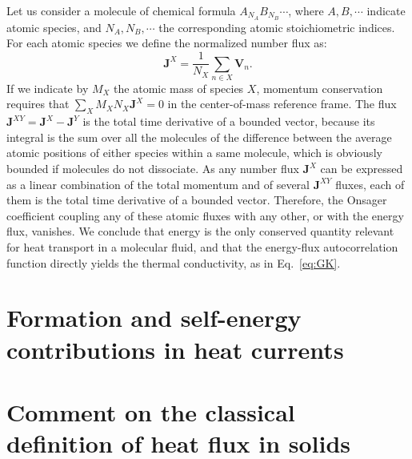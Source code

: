Let us consider a molecule of chemical formula $A_{N_A} B_{N_B}\cdots$, where $A, B,\cdots$ indicate atomic species, and $N_A,N_B,\cdots$ the corresponding atomic stoichiometric indices. For each atomic species we define the normalized number flux as:
\begin{equation}
  \mathbf{J}^X = \frac{1}{N_X}\sum_{n\in X} \mathbf{V}_n. \label{eq:JX}
\end{equation}
If we indicate by $M_X$ the atomic mass of species $X$, momentum conservation requires that $\sum_X M_X N_X \mathbf{J}^X = 0$ in the center-of-mass reference frame. The flux $\mathbf{J}^{XY} = \mathbf{J}^{X}-\mathbf{J}^{Y}$ is the total time derivative of a bounded vector, because its integral is the sum over all the molecules of the difference between the average atomic positions of either species within a same molecule, which is obviously bounded if molecules do not dissociate. As any number flux $\mathbf{J}^X$ can be expressed as a linear combination of the total momentum and of several $\mathbf{J}^{XY}$ fluxes, each of them is the total time derivative of a bounded vector. Therefore, the Onsager coefficient coupling any of these atomic fluxes with any other, or with the energy flux, vanishes. We conclude that energy is the only conserved quantity relevant for heat transport in a molecular fluid, and that the energy-flux autocorrelation function directly yields the thermal conductivity, as in Eq.~\eqref{eq:GK}.


\section{Formation and self-energy contributions in heat currents}  \label{sec:gauge-renormalization}


\section{Comment on the classical definition of heat flux in solids}  \label{sec:carbogno}


